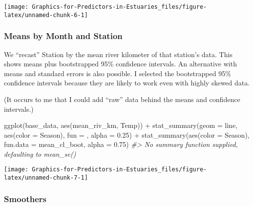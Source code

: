 \documentclass[
]{article}
\newenvironment{Shaded}{\begin{snugshade}}{\end{snugshade}}
\newcommand{\AttributeTok}[1]{\textcolor[rgb]{0.77,0.63,0.00}{#1}}
\newcommand{\CommentTok}[1]{\textcolor[rgb]{0.56,0.35,0.01}{\textit{#1}}}
\newcommand{\FloatTok}[1]{\textcolor[rgb]{0.00,0.00,0.81}{#1}}
\newcommand{\FunctionTok}[1]{\textcolor[rgb]{0.00,0.00,0.00}{#1}}
\newcommand{\NormalTok}[1]{#1}
\newcommand{\SpecialCharTok}[1]{\textcolor[rgb]{0.00,0.00,0.00}{#1}}
\newcommand{\StringTok}[1]{\textcolor[rgb]{0.31,0.60,0.02}{#1}}
\begin{document}
\begin{center}\texttt{[image: Graphics-for-Predictors-in-Estuaries\_files/figure-latex/unnamed-chunk-6-1]} \end{center}

\hypertarget{means-by-month-and-station}{%
\subsubsection{Means by Month and
Station}\label{means-by-month-and-station}}

We ``recast'' Station by the mean river kilometer of that station's
data. This shows means plus bootstrapped 95\% confidence intervals. An
alternative with means and standard errors is also possible. I selected
the bootstrapped 95\% confidence intervals because they are likely to
work even with highly skewed data.

(It occurs to me that I could add ``raw'' data behind the means and
confidence intervals.)

\begin{Shaded}
\begin{Highlighting}[]
\FunctionTok{ggplot}\NormalTok{(base\_data, }\FunctionTok{aes}\NormalTok{(mean\_riv\_km, Temp)) }\SpecialCharTok{+}
    \FunctionTok{stat\_summary}\NormalTok{(}\AttributeTok{geom =} \StringTok{\textquotesingle{}line\textquotesingle{}}\NormalTok{, }
                 \FunctionTok{aes}\NormalTok{(}\AttributeTok{color =}\NormalTok{ Season), }
                 \AttributeTok{fun =}\NormalTok{ ,}
                 \AttributeTok{alpha =} \FloatTok{0.25}\NormalTok{) }\SpecialCharTok{+}
  \FunctionTok{stat\_summary}\NormalTok{(}\FunctionTok{aes}\NormalTok{(}\AttributeTok{color =}\NormalTok{ Season), }
               \AttributeTok{fun.data =}\NormalTok{ mean\_cl\_boot,}
               \AttributeTok{alpha =} \FloatTok{0.75}\NormalTok{)}
\CommentTok{\#\textgreater{} No summary function supplied, defaulting to \textasciigrave{}mean\_se()\textasciigrave{}}
\end{Highlighting}
\end{Shaded}

\begin{center}\texttt{[image: Graphics-for-Predictors-in-Estuaries\_files/figure-latex/unnamed-chunk-7-1]} \end{center}

\hypertarget{smoothers}{%
\subsubsection{Smoothers}\label{smoothers}}
\end{document}

